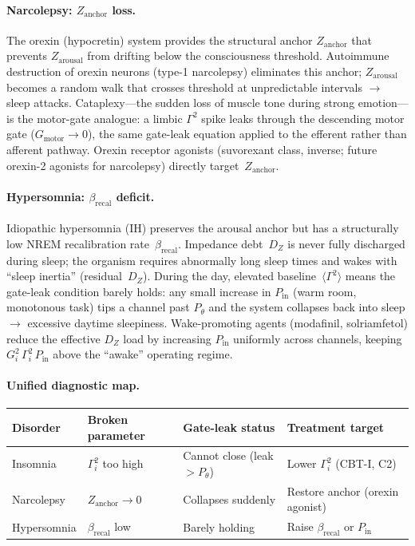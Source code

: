 \documentclass[aps,pre,twocolumn,superscriptaddress,floatfix]{revtex4-2}
\begin{document}
\paragraph{Narcolepsy: $Z_{\mathrm{anchor}}$ loss.}
The orexin (hypocretin) system provides the structural
anchor $Z_{\mathrm{anchor}}$ that prevents
$Z_{\mathrm{arousal}}$ from drifting below the
consciousness threshold.
Autoimmune destruction of orexin neurons
(type-1 narcolepsy) eliminates this anchor;
$Z_{\mathrm{arousal}}$ becomes a random walk
that crosses threshold at unpredictable intervals
$\to$ sleep attacks.
Cataplexy---the sudden loss of muscle tone during
strong emotion---is the motor-gate analogue:
a limbic $\Gamma^2$ spike leaks through the
descending motor gate ($G_{\text{motor}} \to 0$),
the same gate-leak equation applied to the
efferent rather than afferent pathway.
Orexin receptor agonists (suvorexant class, inverse;
future orexin-2 agonists for narcolepsy) directly
target~$Z_{\mathrm{anchor}}$.

\paragraph{Hypersomnia: $\beta_{\mathrm{recal}}$ deficit.}
Idiopathic hypersomnia (IH) preserves the arousal
anchor but has a structurally low NREM recalibration
rate~$\beta_{\mathrm{recal}}$.
Impedance debt~$D_Z$ is never fully discharged
during sleep;
the organism requires abnormally long sleep times
and wakes with ``sleep inertia'' (residual~$D_Z$).
During the day, elevated baseline~$\langle\Gamma^2\rangle$
means the gate-leak condition barely holds:
any small increase in $P_{\mathrm{in}}$
(warm room, monotonous task) tips a channel past
$P_\theta$ and the system collapses back into sleep
$\to$ excessive daytime sleepiness.
Wake-promoting agents (modafinil, solriamfetol)
reduce the effective $D_Z$ load by increasing
$P_{\mathrm{in}}$ uniformly across channels,
keeping $G_i^2\,\Gamma_i^2\,P_{\mathrm{in}}$
above the ``awake'' operating regime.

\paragraph{Unified diagnostic map.}

\begin{center}
\begin{tabular}{@{}llll@{}}
\hline
\textbf{Disorder} & \textbf{Broken parameter}
  & \textbf{Gate-leak status}
  & \textbf{Treatment target} \\
\hline
Insomnia
  & $\Gamma_i^2$ too high
  & Cannot close (leak $> P_\theta$)
  & Lower $\Gamma_i^2$ (CBT-I, C2) \\
Narcolepsy
  & $Z_{\text{anchor}} \to 0$
  & Collapses suddenly
  & Restore anchor (orexin agonist) \\
Hypersomnia
  & $\beta_{\text{recal}}$ low
  & Barely holding
  & Raise $\beta_{\text{recal}}$ or $P_{\text{in}}$ \\
\hline
\end{tabular}
\end{center}
\end{document}
